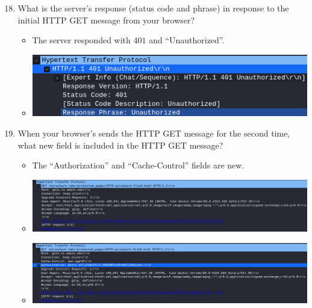 \documentclass[11pt]{article}
\begin{document}
\begin{enumerate}
  \setcounter{enumi}{17}
\item What is the server’s response (status code and phrase) in response to the
  initial HTTP GET message from your browser?
  \begin{itemize}
  \item The server responded with $401$ and ``Unauthorized''.
  \item \includegraphics[width=\textwidth]{img/ws-auth-1}
  \end{itemize}
\item When your browser’s sends the HTTP GET message for the second time, what
  new field is included in the HTTP GET message?
  \begin{itemize}
  \item The ``Authorization'' and ``Cache-Control'' fields are new.
  \item \includegraphics[width=\textwidth]{img/ws-auth-new-fields-1}
  \item \includegraphics[width=\textwidth]{img/ws-auth-new-fields-2}
  \end{itemize}
\end{enumerate}


\break
\end{document}
